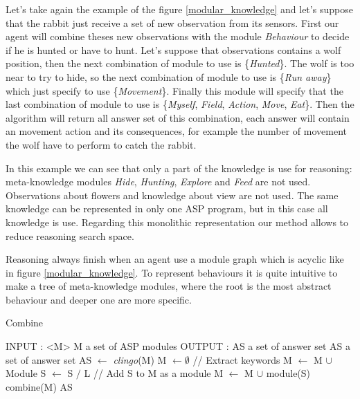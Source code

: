 \documentclass{aamas2012}
\begin{document}
	Let's take again the example of the figure \ref{modular_knowledge} and let's suppose that the rabbit just receive a set of new observation from its sensors.
	First our agent will combine theses new observations with the module \emph{Behaviour} to decide if he is hunted or have to hunt.
	Let's suppose that observations contains a wolf position, then the next combination of module to use is \{\emph{Hunted}\}.
	The wolf is too near to try to hide, so the next combination of module to use is \{\emph{Run away}\} which just specify to use \{\emph{Movement}\}.
	Finally this module will specify that the last combination of module to use is \{\emph{Myself}, \emph{Field}, \emph{Action}, \emph{Move}, \emph{Eat}\}.
	Then the algorithm will return all answer set of this combination, each answer will contain an movement action and its consequences, 
	for example the number of movement the wolf have to perform to catch the rabbit.
	
	In this example we can see that only a part of the knowledge is use for reasoning: 
	meta-knowledge modules \emph{Hide}, \emph{Hunting}, \emph{Explore} and \emph{Feed} are not used.
	Observations about flowers and knowledge about view are not used.
	The same knowledge can be represented in only one ASP program, but in this case all knowledge is use.
	Regarding this monolithic representation our method allows to reduce reasoning search space.
	
	Reasoning always finish when an agent use a module graph which is acyclic like in figure \ref{modular_knowledge}.
	To represent behaviours it is quite intuitive to make a tree of meta-knowledge modules, 
	where the root is the most abstract behaviour and deeper one are more specific.

	\begin{algorithm}
	\caption{Combine}
	\label{framework_algorithm}
	\begin{algorithmic}[1]
	\STATE INPUT : <M> M a set of ASP modules
	\STATE OUTPUT : AS a set of answer set
	\newline
	\STATE AS a set of answer set
	\newline
	\STATE AS $\leftarrow$ \textit{clingo}(M)
	\newline
		\STATE M $\leftarrow \emptyset$ 
		\newline
		\STATE // Extract keywords
				\STATE M $\leftarrow$ M $\cup$ Module
				\STATE S $\leftarrow$ S $/$ L
			\ENDIF
		\ENDFOR
		\newline
			\STATE // Add S to M as a module
			\STATE M $\leftarrow$ M $\cup$ module(S)
			\STATE combine(M)
		\ENDIF
	\ENDFOR
	\newline
	\RETURN AS
	\end{algorithmic}
	\end{algorithm}
\end{document}
